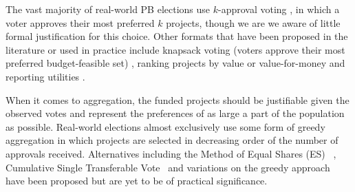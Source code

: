 \documentclass{comsoc2023}
\newcommand{\mes}{ES}
\begin{document}


The vast majority of real-world PB elections use $k$-approval voting \cite{aziz2021participatory}, in which a voter approves their most preferred $k$ projects, though we are we aware of little formal justification for this choice.  Other formats that have been proposed in the literature or used in practice include knapsack voting (voters approve their most preferred budget-feasible set)  \cite{goel2019knapsack}, ranking projects by value or value-for-money  \cite{aziz2020expanding, benade2021preference} and reporting utilities \cite{peters2021proportional}. 



When it comes to aggregation,  the funded projects should be justifiable given the observed votes and represent the preferences of  as large a part of the population as possible. 
Real-world elections almost exclusively use some form of greedy aggregation in which projects are selected in decreasing order of the number of approvals   received.  Alternatives including the Method of Equal Shares (\mes{})~\citep{peters2021proportional} , Cumulative Single Transferable Vote~\citep{skowron2020participatory} and variations on the greedy approach~\citep{talmon2019framework} have been proposed %
but are yet to be of practical significance.
\end{document}
